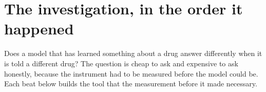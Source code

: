 %
%
%
%
%
\chapter{The investigation, in the order it happened}
\label{sec:methods}
\label{sec:results}

\begin{question}
Does a model that has learned something about a drug answer differently when it
is told a different drug? The question is cheap to ask and expensive to ask
honestly, because the instrument had to be measured before the model could be.
Each beat below builds the tool that the measurement before it made necessary.
\end{question}


